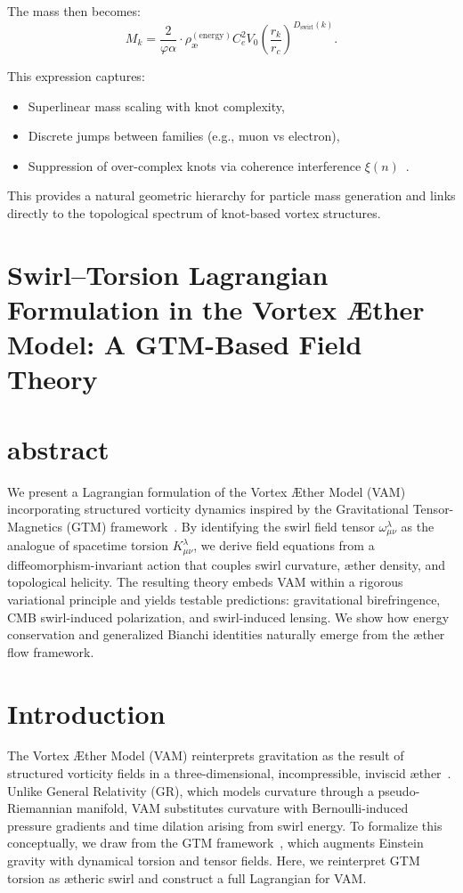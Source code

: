 \documentclass[12pt]{article}
\begin{document}
    The mass then becomes:
    \[
        M_k = \frac{2}{\varphi \alpha} \cdot \rho_\text{\ae}^{(\text{energy})} C_e^2 V_0 \left( \frac{r_k}{r_c} \right)^{D_\text{swirl}(k)}.
    \]

    This expression captures:
    \begin{itemize}
        \item Superlinear mass scaling with knot complexity,
        \item Discrete jumps between families (e.g., muon vs electron),
        \item Suppression of over-complex knots via coherence interference \( \xi(n) \)~\cite{vam2024mass}.
    \end{itemize}

    This provides a natural geometric hierarchy for particle mass generation and links directly to the topological spectrum of knot-based vortex structures.



    \section{\textbf{Swirl--Torsion Lagrangian Formulation in the Vortex \AE ther Model: A GTM-Based Field Theory}}


        \section{abstract}
            We present a Lagrangian formulation of the Vortex \AE ther Model (VAM) incorporating structured vorticity dynamics inspired by the Gravitational Tensor-Magnetics (GTM) framework~\cite{brown2025gtm}. By identifying the swirl field tensor \( \omega^\lambda_{\mu\nu} \) as the analogue of spacetime torsion \( K^\lambda_{\mu\nu} \), we derive field equations from a diffeomorphism-invariant action that couples swirl curvature, æther density, and topological helicity. The resulting theory embeds VAM within a rigorous variational principle and yields testable predictions: gravitational birefringence, CMB swirl-induced polarization, and swirl-induced lensing. We show how energy conservation and generalized Bianchi identities naturally emerge from the æther flow framework.


        \section{Introduction}

        The Vortex \AE ther Model (VAM) reinterprets gravitation as the result of structured vorticity fields in a three-dimensional, incompressible, inviscid æther~\cite{vam2024swirl}. Unlike General Relativity (GR), which models curvature through a pseudo-Riemannian manifold, VAM substitutes curvature with Bernoulli-induced pressure gradients and time dilation arising from swirl energy. To formalize this conceptually, we draw from the GTM framework~\cite{brown2025gtm}, which augments Einstein gravity with dynamical torsion and tensor fields. Here, we reinterpret GTM torsion as ætheric swirl and construct a full Lagrangian for VAM.
\end{document}
